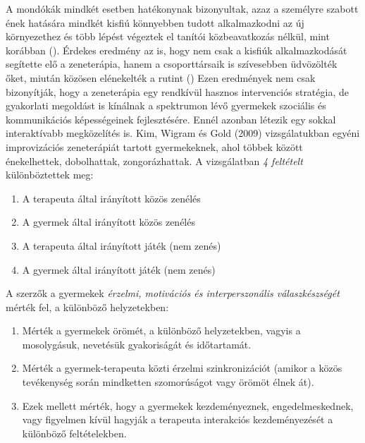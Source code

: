 A mondókák mindkét esetben hatékonynak bizonyultak, azaz a személyre szabott ének hatására mindkét kisfiú könnyebben tudott alkalmazkodni az új környezethez és több lépést végeztek el tanítói közbeavatkozás nélkül, mint korábban (\cite{kern_wolery_aldridge_2006}). Érdekes eredmény az is, hogy nem csak a kisfiúk alkalmazkodását segítette elő a zeneterápia, hanem a csoporttársaik is szívesebben üdvözölték őket, miután közösen elénekelték a rutint (\cite{kern_wolery_aldridge_2006}) Ezen eredmények nem csak bizonyítják, hogy a zeneterápia egy rendkívül hasznos intervenciós stratégia, de gyakorlati megoldást is kínálnak a spektrumon lévő gyermekek szociális és kommunikációs képességeinek fejlesztésére. Ennél azonban létezik egy sokkal interaktívabb megközelítés is. Kim, Wigram és Gold (2009) vizsgálatukban egyéni improvizációs zeneterápiát tartott gyermekeknek, ahol többek között énekelhettek, dobolhattak, zongorázhattak. 
A vizsgálatban \textit{4 feltételt} különböztettek meg:
\begin{enumerate}
	\item A terapeuta által irányított közös zenélés
	\item A gyermek által irányított közös zenélés
	\item A terapeuta által irányított játék (nem zenés)
	\item A gyermek által irányított játék (nem zenés)
\end{enumerate}    
A szerzők a gyermekek \textit{érzelmi, motivációs és interperszonális válaszkészségét } mérték fel, a különböző helyzetekben:

\begin{enumerate}
	\item Mérték a gyermekek örömét, a különböző helyzetekben, vagyis a mosolygásuk, nevetésük gyakoriságát és időtartamát.
	\item Mérték a gyermek-terapeuta közti érzelmi szinkronizációt (amikor a közös tevékeny\-ség során mindketten szomorúságot vagy örömöt élnek át).
	\item Ezek mellett mérték, hogy a gyermekek kezdeményeznek, engedelmeskednek, vagy figyelmen kívül hagyják a terapeuta interakciós kezdeményezését a különböző felté\-telekben.
\end{enumerate} 

